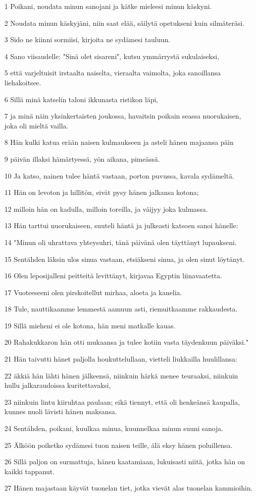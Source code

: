 \par 1 Poikani, noudata minun sanojani ja kätke mieleesi minun käskyni.
\par 2 Noudata minun käskyjäni, niin saat elää, säilytä opetukseni kuin silmäteräsi.
\par 3 Sido ne kiinni sormiisi, kirjoita ne sydämesi tauluun.
\par 4 Sano viisaudelle: "Sinä olet sisareni", kutsu ymmärrystä sukulaiseksi,
\par 5 että varjeltuisit irstaalta naiselta, vieraalta vaimolta, joka sanoillansa liehakoitsee.
\par 6 Sillä minä katselin taloni ikkunasta ristikon läpi,
\par 7 ja minä näin yksinkertaisten joukossa, havaitsin poikain seassa nuorukaisen, joka oli mieltä vailla.
\par 8 Hän kulki katua erään naisen kulmaukseen ja asteli hänen majaansa päin
\par 9 päivän illaksi hämärtyessä, yön aikana, pimeässä.
\par 10 Ja katso, nainen tulee häntä vastaan, porton puvussa, kavala sydämeltä.
\par 11 Hän on levoton ja hillitön, eivät pysy hänen jalkansa kotona;
\par 12 milloin hän on kadulla, milloin toreilla, ja väijyy joka kulmassa.
\par 13 Hän tarttui nuorukaiseen, suuteli häntä ja julkeasti katsoen sanoi hänelle:
\par 14 "Minun oli uhrattava yhteysuhri, tänä päivänä olen täyttänyt lupaukseni.
\par 15 Sentähden läksin ulos sinua vastaan, etsiäkseni sinua, ja olen sinut löytänyt.
\par 16 Olen leposijalleni peitteitä levittänyt, kirjavaa Egyptin liinavaatetta.
\par 17 Vuoteeseeni olen pirskoitellut mirhaa, aloeta ja kanelia.
\par 18 Tule, nauttikaamme lemmestä aamuun asti, riemuitkaamme rakkaudesta.
\par 19 Sillä mieheni ei ole kotona, hän meni matkalle kauas.
\par 20 Rahakukkaron hän otti mukaansa ja tulee kotiin vasta täydenkuun päiväksi."
\par 21 Hän taivutti hänet paljolla houkuttelullaan, vietteli liukkailla huulillansa:
\par 22 äkkiä hän lähti hänen jälkeensä, niinkuin härkä menee teuraaksi, niinkuin hullu jalkaraudoissa kuritettavaksi,
\par 23 niinkuin lintu kiiruhtaa paulaan; eikä tiennyt, että oli henkeänsä kaupalla, kunnes nuoli lävisti hänen maksansa.
\par 24 Sentähden, poikani, kuulkaa minua, kuunnelkaa minun suuni sanoja.
\par 25 Älköön poiketko sydämesi tuon naisen teille, älä eksy hänen poluillensa.
\par 26 Sillä paljon on surmattuja, hänen kaatamiaan, lukuisasti niitä, jotka hän on kaikki tappanut.
\par 27 Hänen majastaan käyvät tuonelan tiet, jotka vievät alas tuonelan kammioihin.

